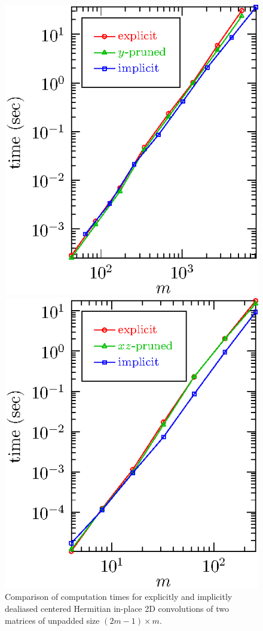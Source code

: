 \documentclass[final]{siamltex}
\begin{document}
\begin{figure}[htbp]
\begin{minipage}{0.5\linewidth}
\begin{center}
\includegraphics{timing2r}
\caption{Comparison of computation times for explicitly and implicitly
dealiased centered Hermitian in-place 2D convolutions of two matrices of
unpadded size $(2m-1)\times m$.}
\label{timing2r}
\end{center}
\end{minipage}
\begin{minipage}{0.5\linewidth}
\begin{center}
\includegraphics{timing3c}

\end{center}
\end{minipage}
\end{figure}
\end{document}
